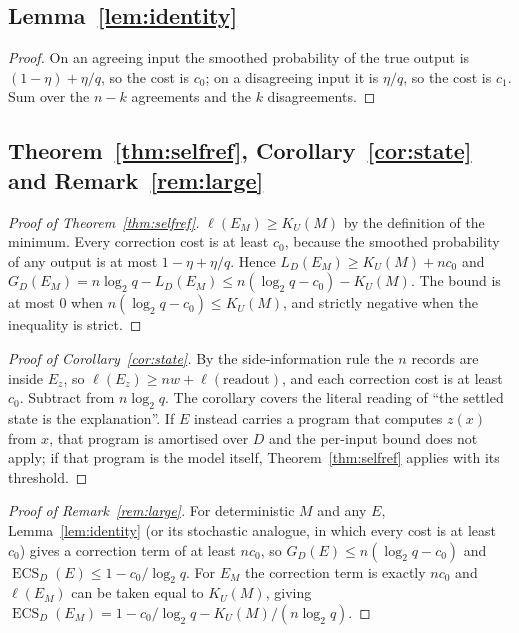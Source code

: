 \documentclass[11pt,letterpaper]{article}
\newcommand{\D}{D}
\DeclareMathOperator{\ECS}{ECS}
\newcommand{\cz}{c_{0}}
\newcommand{\co}{c_{1}}
\newcommand{\Ltwo}{\log_{2}}
\theoremstyle{plain}
\theoremstyle{definition}
\theoremstyle{remark}
\begin{document}
\subsection{Lemma~\ref{lem:identity}}
\begin{proof}
On an agreeing input the smoothed probability of the true output is $(1-\eta)+\eta/q$, so the cost is $\cz$; on a disagreeing input it is $\eta/q$, so the cost is $\co$. Sum over the $n-k$ agreements and the $k$ disagreements.
\end{proof}

\subsection{Theorem~\ref{thm:selfref}, Corollary~\ref{cor:state} and Remark~\ref{rem:large}}
\begin{proof}[Proof of Theorem~\ref{thm:selfref}]
$\ell(E_M)\ge K_U(M)$ by the definition of the minimum. Every correction cost is at least $\cz$, because the smoothed probability of any output is at most $1-\eta+\eta/q$. Hence $L_{\D}(E_M)\ge K_U(M)+n\cz$ and $G_{\D}(E_M)=n\Ltwo q-L_{\D}(E_M)\le n(\Ltwo q-\cz)-K_U(M)$. The bound is at most 0 when $n(\Ltwo q-\cz)\le K_U(M)$, and strictly negative when the inequality is strict.
\end{proof}

\begin{proof}[Proof of Corollary~\ref{cor:state}]
By the side-information rule the $n$ records are inside $E_z$, so $\ell(E_z)\ge nw+\ell(\mathrm{readout})$, and each correction cost is at least $\cz$. Subtract from $n\Ltwo q$. The corollary covers the literal reading of ``the settled state is the explanation''. If $E$ instead carries a program that computes $z(x)$ from $x$, that program is amortised over $\D$ and the per-input bound does not apply; if that program is the model itself, Theorem~\ref{thm:selfref} applies with its threshold.
\end{proof}

\begin{proof}[Proof of Remark~\ref{rem:large}]
For deterministic $M$ and any $E$, Lemma~\ref{lem:identity} (or its stochastic analogue, in which every cost is at least $\cz$) gives a correction term of at least $n\cz$, so $G_{\D}(E)\le n(\Ltwo q-\cz)$ and $\ECS_{\D}(E)\le1-\cz/\Ltwo q$. For $E_M$ the correction term is exactly $n\cz$ and $\ell(E_M)$ can be taken equal to $K_U(M)$, giving $\ECS_{\D}(E_M)=1-\cz/\Ltwo q-K_U(M)/(n\Ltwo q)$.
\end{proof}
\end{document}

